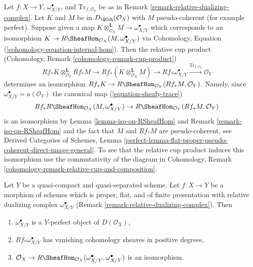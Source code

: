 \begin{remark}
\label{remark-relative-dualizing-complex-relative-cup-product}
Let $f : X \to Y$, $\omega^\bullet_{X/Y}$, and $\text{Tr}_{f, \mathcal{O}_Y}$
be as in Remark \ref{remark-relative-dualizing-complex}.
Let $K$ and $M$ be in $D_\QCoh(\mathcal{O}_X)$ with
$M$ pseudo-coherent (for example perfect). Suppose given a map
$K \otimes_{\mathcal{O}_X}^\mathbf{L} M \to \omega^\bullet_{X/Y}$
which corresponds to an isomorphism
$K \to R\SheafHom_{\mathcal{O}_X}(M, \omega^\bullet_{X/Y})$
via Cohomology, Equation (\ref{cohomology-equation-internal-hom}).
Then the relative cup product
(Cohomology, Remark \ref{cohomology-remark-cup-product})
$$
Rf_*K \otimes_{\mathcal{O}_Y}^\mathbf{L} Rf_*M
\to
Rf_*(K \otimes_{\mathcal{O}_X}^\mathbf{L} M)
\to
Rf_*\omega^\bullet_{X/Y}
\xrightarrow{\text{Tr}_{f, \mathcal{O}_Y}}
\mathcal{O}_Y
$$
determines an isomorphism
$Rf_*K \to R\SheafHom_{\mathcal{O}_Y}(Rf_*M, \mathcal{O}_Y)$.
Namely, since $\omega^\bullet_{X/Y} = a(\mathcal{O}_Y)$
the canonical map (\ref{equation-sheafy-trace})
$$
Rf_*R\SheafHom_{\mathcal{O}_X}(M, \omega^\bullet_{X/Y}) \to
R\SheafHom_{\mathcal{O}_Y}(Rf_*M, \mathcal{O}_Y)
$$
is an isomorphism by
Lemma \ref{lemma-iso-on-RSheafHom} and
Remark \ref{remark-iso-on-RSheafHom}
and the fact that $M$ and $Rf_*M$ are pseudo-coherent, see
Derived Categories of Schemes, Lemma
\ref{perfect-lemma-flat-proper-pseudo-coherent-direct-image-general}.
To see that the relative cup product
induces this isomorphism use the commutativity of the diagram in
Cohomology, Remark \ref{cohomology-remark-relative-cup-and-composition}.
\end{remark}

\begin{lemma}
\label{lemma-properties-relative-dualizing}
Let $Y$ be a quasi-compact and quasi-separated scheme.
Let $f : X \to Y$ be a morphism of schemes which is
proper, flat, and of finite presentation with
relative dualizing complex $\omega_{X/Y}^\bullet$
(Remark \ref{remark-relative-dualizing-complex}).
Then
\begin{enumerate}
\item $\omega_{X/Y}^\bullet$ is a $Y$-perfect object of $D(\mathcal{O}_X)$,
\item $Rf_*\omega_{X/Y}^\bullet$ has vanishing cohomology sheaves
in positive degrees,
\item $\mathcal{O}_X \to
R\SheafHom_{\mathcal{O}_X}(\omega_{X/Y}^\bullet, \omega_{X/Y}^\bullet)$
is an isomorphism.
\end{enumerate}
\end{lemma}

